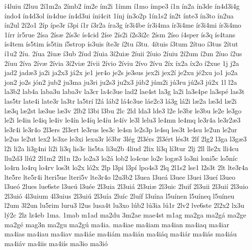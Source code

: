 {^^ed4luiu
^^ed2luu
2^^ed1m2a
2^^edmb2
^^edm2e
^^edm2i
1^^edmm
^^ed1mo
^^edmpe3
^^ed1n
^^edn2a
^^edn3de
^^edn4d3i4g
^^edndo4
^^edn4d3ol
^^edn4due
^^edn4d3ui
^^edni4cit
1^^ednj
^^edn3o2p
1^^edn1s2
^^edn2t
^^ednte3
^^edn3to
^^edn2ua
^^edn2ul
2^^ed2o1
2^^edp
^^edpe3r
^^ed3pi
^^ed1r
^^ed3r2a
^^edra3g
^^edr3i4be
^^edr3i4ma
^^edr3i4me
^^edr3i4mi
^^edr3i4mo
1^^edrr
^^edr5rue
2^^edsa
2^^eds^^e6
2^^eds3c
^^eds4cid
2^^edse
2^^eds2i
^^ed2s3i2c
2^^edsm
2^^edso
^^ed4sper
^^eds3q
^^eds4tans
^^eds4tem
^^eds5tim
^^eds5tin
^^ed5strop
^^eds3uis
^^edte3r
^^ed2tu
^^ed3tu.
4^^edtuis
^^ed3tum
2^^edtuo
^^ed3tus
2^^edtut
^^ed1u2
2^^edu.
2^^edua
2^^edu^^e6
^^ed3ub
2^^edud
2^^eduia
3^^ed2ui^^e6
2^^eduii
2^^eduio
2^^eduiu
2^^ed2um
^^ed2un
2^^eduo
^^ed2us
2^^eduu
2^^edva
2^^edv^^e6
2^^edvia
3^^ed2vi^^e6
2^^edvii
2^^edvio
2^^edviu
2^^edvo
2^^edvu
2^^edx
^^edx2a
^^edx2o
^^ed2xue
1j
j2a
jad2
jad^^e63
ja2i
ja2x3
j^^e12x
je1
jer4o
je2s
je3sus
jex2i
jex2^^ed
je2xu
j^^e92xu
jo1
jo2a
jon2
jo2s
j^^f3n2
jub2
ju3ma
ju3ri
ju2s3
ju2x3
j^^fab2
j^^fam2i
j^^fa3ru
j^^fa2s3
j^^fa2x
1l
l2a
la3b2
lab4a
laba3u
laba3v
la3cr
la4c3ue
lad2
lae4st
la3g
la2i
la3s4pe
la3sp^^e9
las3t
las5tr
late4i
late3r
la3tr
la5tr^^ed
l2^^e1
l^^e1b2
l^^e14c3ue
l^^e1e2c3
l^^e13g
l^^e12i
l^^e62a
l^^e63d
l^^e62i
l^^e63q
l^^e62st
l^^e63ue
l^^e63v
2lb2
l3bi
l3bu
2lc
2ld
lda3
lde3
l2e
le3br
le3bu
le2e
le3go
le2i
le4in
le4iq
le4iv
le4^^edn
le4^^edq
le4^^edu
le4^^edv
le3l
lelu3
le4mn
le4mq
le3r4a
le3r2^^e63
le3r4i
le3r4o
2l3ers
2l3ert
le3rus
les3c
le4sn
le2s3p
le4sq
les3t
le4su
le2un
le2ur
le2us
le2ut
lex2
le3xe
le3xi
lexu3r
l^^e93br
3l^^e9g
2l3^^e9rs
2l3^^e9rt
l^^e9s3t
2lf
2lg2
l3ga
l3g^^e63
l2i
li2a
li3g4ni
li2i
li3q
lis3c
lis5ta
li3u2b
4liud
2lix
l^^ed3q
l^^ed3tur
2lj
2ll
lle2x
lli4cu
llu2d3
ll^^fa2
2l1m2
2l1n
l2o
lo2a3
lo2^^e1
lob2
lo4cue
lo2e
log^^e63
lo3ni
loni5c
lo5n^^edc
lo4rn
lo4rq
lo4rv
los3t
lo2x
l^^f32x
2lp
l3pi
l3p^^ed
lpo4s3
2lq
2l1s2
lse1
l2s3t
2lt
lte3r4a
lte5re
lte5r4i
lteri5ue
lteri5v
lte3r4o
l2u3b2
l3uea
l3ue^^e1
l3uee
l3uei
l3ue^^ed
l3ueo
l3ue^^f3
2lues
lue6ste
l3ue^^fa
l3u^^e9e
2l3uia
2l3ui^^e1
2l3ui^^e6
2l3uic
2luif
2l3uii
2l3ui^^ed
2l3uio
2l3ui^^f3
4l3uium
4l3uius
2l3ui^^fa
2l3u^^eda
2lu^^edc
2lu^^edf
l3u^^edna
l5u^^ednen
l5u^^edneq
l5u^^edneu
l2um
3l2un
lu5rim
luru3
l2us
lusa4t
lu3xo
l^^fab2
l^^fa3ia
l^^fa1r
2lv2
lve6ste
2l2x2
lx3u
l^^fd2c
2lz
lz4eb
1ma.
1mab
m1ad
ma2du
3m2ae
mae4st
m1ag
ma2ga
ma2g^^e1
ma2ge
ma2g^^e9
mag3n
ma2gu
ma2g^^fa
ma4ia.
ma4iae
ma4iam
ma4ian
ma4iaq
ma4iar
ma4ias
ma4iau
ma4iav
ma4i^^e1e
ma4i^^e1m
ma4i^^e1n
ma4i^^e1q
ma4i^^e1r
ma4i^^e1s
ma4i^^e1u
ma4i^^e1v
ma4iis
ma4i^^eds
ma3io
ma3i^^f3
}

